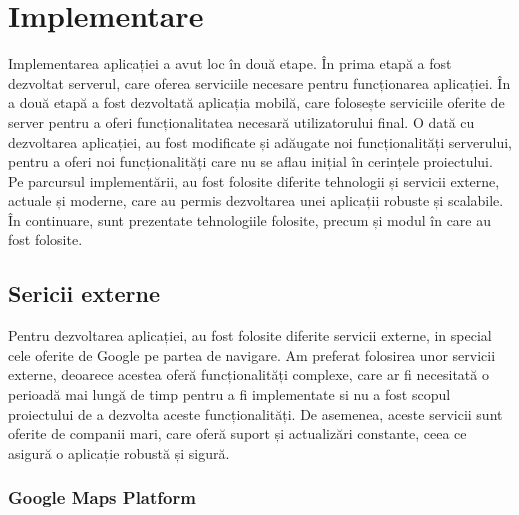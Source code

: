 \chapter{Implementare}

Implementarea aplicației a avut loc în două etape. În prima etapă a fost dezvoltat serverul, care oferea serviciile necesare pentru funcționarea aplicației. În a două etapă a fost dezvoltată aplicația mobilă, care folosește serviciile oferite de server pentru a oferi funcționalitatea necesară utilizatorului final. O dată cu dezvoltarea aplicației, au fost modificate și adăugate noi funcționalități serverului, pentru a oferi noi funcționalități care nu se aflau inițial în cerințele proiectului.
Pe parcursul implementării, au fost folosite diferite tehnologii și servicii externe, actuale și moderne, care au permis dezvoltarea unei aplicații robuste și scalabile. În continuare, sunt prezentate tehnologiile folosite, precum și modul în care au fost folosite.

\section{Sericii externe}

Pentru dezvoltarea aplicației, au fost folosite diferite servicii externe, in special cele oferite de Google pe partea de navigare. Am preferat folosirea unor servicii externe, deoarece acestea oferă funcționalități complexe, care ar fi necesitată o perioadă mai lungă de timp pentru a fi implementate si nu a fost scopul proiectului de a dezvolta aceste funcționalități. De asemenea, aceste servicii sunt oferite de companii mari, care oferă suport și actualizări constante, ceea ce asigură o aplicație robustă și sigură.

\newpage

\subsection{Google Maps Platform}

